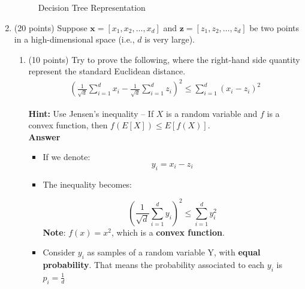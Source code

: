 \documentclass[11pt]{article}
\begin{document}
\begin{enumerate}
\begin{figure}[ht]
    \caption{Decision Tree Representation}
\end{figure}


\item (20 points) Suppose $\boldsymbol x = [x_1, x_2, \dots,
x_d]$ and $\boldsymbol z = [z_1, z_2, \dots, z_d]$ be two points in
a high-dimensional space (i.e., $d$ is very large).

\begin{enumerate}
    \item (10 points) Try to prove the following, where the
    right-hand side quantity represent the standard Euclidean
    distance.
    \begin{align*}
        \left(\frac{1}{\sqrt{d}}\sum_{i=1}^d x_i - \frac{1}{\sqrt{d}} \sum_{i=1}^d z_i \right)^2 \le
        \sum_{i=1}^d \left(x_i - z_i\right)^2
    \end{align*}

    \textbf{Hint: } Use Jensen’s inequality – If $X$ is a random
    variable and $f$ is a convex function, then $f(E[X]) \le
    E[f(X)]$.\\

    \textbf{Answer}

\begin{itemize}
    \item If we denote: 
    \[y_i=x_i-z_i\]

    \item The inequality becomes:

    \[(\frac{1}{\sqrt{d}}\sum_{i=1}^d y_i)^2 \leq \sum_{i=1}^d y_i^2\] \textbf{Note}: $f(x) = x^2$, which is a \textbf{convex function}.

    \item Consider $y_i$ as samples of a random variable Y, with \textbf{equal probability}. That means the probability associated to each $y_i$ is $p_i = \frac{1}{d}$


\end{itemize}
\end{enumerate}
\end{enumerate}
\end{document}
